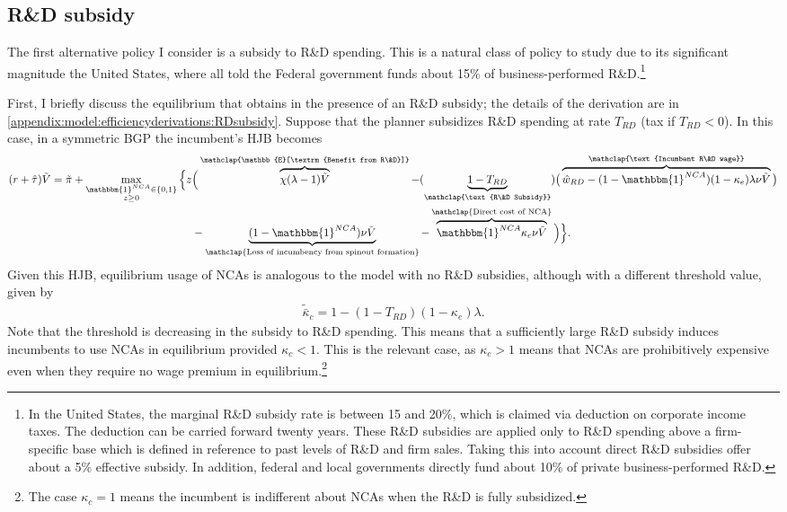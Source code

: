 \documentclass[ecta,nameyear,final]{econsocart}
\theoremstyle{plain}
\theoremstyle{remark}
\begin{document}
\subsection{R\&D subsidy}

The first alternative policy I consider is a subsidy to R\&D spending. This is a natural class of policy to study due to its significant magnitude the United States, where all told the Federal government funds about 15\% of business-performed R\&D.\footnote{In the United States, the marginal R\&D subsidy rate is between 15 and 20\%, which is claimed via  deduction on corporate income taxes. The deduction can be carried forward twenty years. These R\&D subsidies are applied only to R\&D spending above a firm-specific base which is defined in reference to past levels of R\&D and firm sales. Taking this into account direct R\&D subsidies offer about a 5\% effective subsidy.  In addition, federal and local governments directly fund about 10\% of private business-performed R\&D.}

First, I briefly discuss the equilibrium that obtains in the presence of an R\&D subsidy; the details of the derivation are in \ref{appendix:model:efficiencyderivations:RDsubsidy}. Suppose that the planner subsidizes R\&D spending at rate $T_{RD}$ (tax if $T_{RD} < 0$). In this case, in a symmetric BGP the incumbent's HJB becomes
\begin{align}
	(r + \hat{\tau}) \tilde{V} = \tilde{\pi} + \max_{\substack{\mathbbm{1}^{NCA} \in \{0,1\} \\ z \ge 0}} \Big\{z &\Big( \overbrace{\chi (\lambda - 1) \tilde{V}}^{\mathclap{\mathbb{E}[\textrm{Benefit from R\&D}]}}- (\underbrace{1-T_{RD}}_{\mathclap{\text{R\&D Subsidy}}}) \big( \overbrace{\hat{w}_{RD} - (1-\mathbbm{1}^{NCA})(1-\kappa_e)\lambda \nu \tilde{V}}^{\mathclap{\text{Incumbent R\&D wage}}}\big) \label{eq:hjb_incumbent_RDsubsidy} \nonumber \\ 
	&-  \underbrace{(1-\mathbbm{1}^{NCA}) \nu \tilde{V}}_{\mathclap{\text{Loss of incumbency from spinout formation}}} - \overbrace{\mathbbm{1}^{NCA} \kappa_{c} \nu \tilde{V}}^{\mathclap{\text{Direct cost of NCA}}}\Big) \Big\}.
\end{align}
Given this HJB, equilibrium usage of NCAs is analogous to the model with no R\&D subsidies, although with a different threshold value, given by
\begin{align}
	\tilde{\bar{\kappa}}_c = 1 - (1 - T_{RD})(1-\kappa_e) \lambda.
\end{align}  
Note that the threshold is decreasing in the subsidy to R\&D spending. This means that a sufficiently large R\&D subsidy induces incumbents to use NCAs in equilibrium provided $\kappa_c < 1$. This is the relevant case, as $\kappa_c > 1$ means that NCAs are prohibitively expensive even when they require no wage premium in equilibrium.\footnote{The case $\kappa_c = 1$ means the incumbent is indifferent about NCAs when the R\&D is fully subsidized.} 
\end{document}

